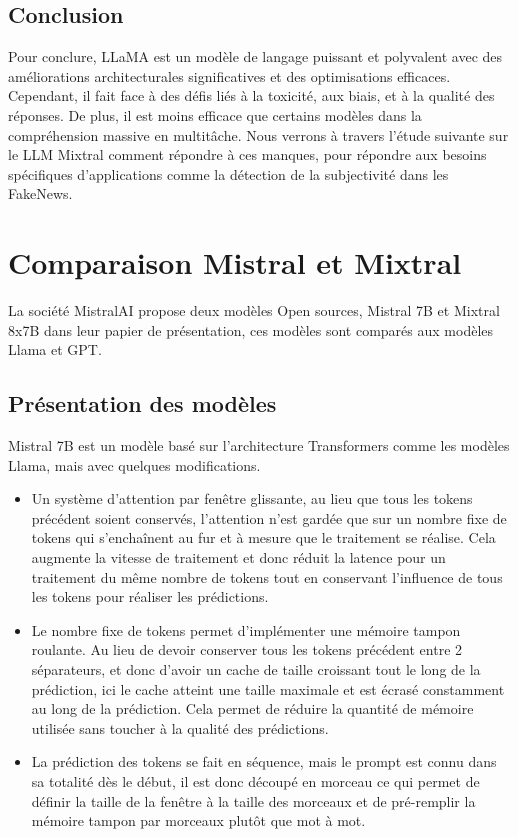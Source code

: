 \documentclass[11pt]{rapport_class}
\begin{document}
\subsection{Conclusion}
\qquad Pour conclure, LLaMA est un modèle de langage puissant et polyvalent avec des améliorations architecturales significatives et des optimisations efficaces. Cependant, il fait face à des défis liés à la toxicité, aux biais, et à la qualité des réponses. De plus, il est moins efficace que certains modèles dans la compréhension massive en multitâche. Nous verrons à travers l’étude suivante sur le LLM Mixtral comment répondre à ces manques, pour répondre aux besoins spécifiques d'applications comme la détection de la subjectivité dans les FakeNews.



\newpage

\section{Comparaison Mistral et Mixtral}

\qquad La société MistralAI propose deux modèles Open sources, Mistral 7B et Mixtral 8x7B dans leur papier de présentation, ces modèles sont comparés aux modèles Llama et GPT.

\subsection{Présentation des modèles}

\qquad Mistral 7B est un modèle basé sur l’architecture Transformers comme les modèles Llama, mais avec quelques modifications.

\begin{itemize}
    \item Un système d’attention par fenêtre glissante, au lieu que tous les tokens précédent soient conservés, l’attention n’est gardée que sur un nombre fixe de tokens qui s'enchaînent au fur et à mesure que le traitement se réalise.  Cela augmente la vitesse de traitement et donc réduit la latence pour un traitement du même nombre de tokens tout en conservant l’influence de tous les tokens pour réaliser les prédictions.
    \item Le nombre fixe de tokens permet d'implémenter une mémoire tampon roulante. Au lieu de devoir conserver tous les tokens précédent entre 2 séparateurs, et donc d’avoir un cache de taille croissant tout le long de la prédiction, ici le cache atteint une taille maximale et est écrasé constamment au long de la prédiction. Cela permet de réduire la quantité de mémoire utilisée sans toucher à la qualité des prédictions.
    \item La prédiction des tokens se fait en séquence, mais le prompt est connu dans sa totalité dès le début, il est donc découpé en morceau ce qui permet de définir la taille de la fenêtre à la taille des morceaux et de pré-remplir la mémoire tampon par morceaux plutôt que mot à mot.
\end{itemize} 
\end{document}
